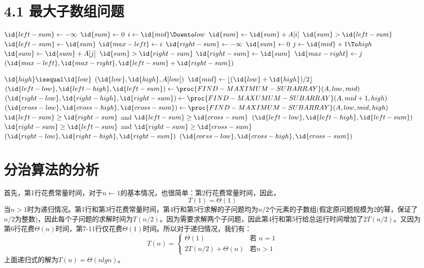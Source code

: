 \documentclass[a4paper,11pt]{article}
\newcommand{\floor}[1]{\left\lfloor #1 \right\rfloor}
\begin{document}
\section*{4.1 最大子数组问题}
\begin{codebox}
\li $\id{left-sum} \gets -\infty$
\li $\id{sum} \gets 0$
\li \For $i \gets \id{mid} \Downto low$
\li 	\Do
			$\id{sum} \gets \id{sum} + A[i]$
\li		\If $\id{sum} > \id{left-sum}$
\li				\Then
					$\id{left-sum} \gets \id{sum}$
\li				$\id{max-left} \gets i$					
					\End
			\End
\li	$\id{right-sum} \gets -\infty$
\li $\id{sum} \gets 0$
\li \For $j \gets \id{mid} + 1 \To high$
\li		\Do
			$\id{sum} \gets \id{sum} + A[j]$
\li		\If $\id{sum} > \id{right-sum}$
\li			\Then
					$\id{right-sum} \gets \id{sum}$
\li				$\id{max-right} \gets j$	
				\End
			\End
			\li \Return $(\id{max-left},\id{max-right},\id{left-sum}+\id{right-sum})$
\end{codebox}

\begin{codebox}
	\li	\If $\id{high} \isequal \id{low}$
	\li		\Then 
					\Return $(\id{low},\id{high},A[low])$
	\li		\Else 
					$\id{mid} \gets \floor{(\id{low}+\id{high})/2}$
	\li			$(\id{left-low},\id{left-high},\id{left-sum}) \gets \proc{FIND-MAXIMUM-SUBARRAY}(A,low,mid)$
	\li			$(\id{right-low},\id{right-high},\id{right-sum}) \gets \proc{FIND-MAXUMUM-SUBARRAY}(A,mid+1,high)$
	\li			$(\id{cross-low},\id{cross-high},\id{cross-sum}) \gets \proc{FIND-MAXIMUM-SUBARRAY}(A,low,mid,high)$
	\li			\If $\id{left-sum} \geq \id{right-sum}$ and $\id{left-sum} \geq \id{cross-sum}$
	\li				\Then \Return $(\id{left-low},\id{left-high},\id{left-sum})$
	\li				\ElseIf $\id{right-sum} \geq \id{left-sum}$ and $\id{right-sum} \geq \id{cross-sum}$
	\li				\Then \Return $(\id{right-low},\id{right-high},\id{right-sum})$
	\li				\ElseNoIf \Return $(\id{corss-low},\id{cross-high},\id{cross-sum})$
						\End
				\End
\end{codebox}
\section*{分治算法的分析}
首先，第1行花费常量时间，对于$n \gets 1$的基本情况，也很简单：第2行花费常量时间，因此，
\[
	T(1) = \Theta(1)
\]
当$n>1$时为递归情况。第1行和第3行花费常量时间，第4行和第5行求解的子问题均为$n/2$个元素的子数组(假定原问题规模为2的幂，保证了$n/2$为整数)，因此每个子问题的求解时间为$T(n/2)$。因为需要求解两个子问题，因此第4行和第5行给总运行时间增加了$2T(n/2)$。又因为第6行花费$\Theta(n)$时间，第7-11行仅花费$\Theta(1)$时间。所以对于递归情况，我们有：
\[
	T(n)=
	\begin{cases}
		\Theta(1) & \text{若 $n=1$}\\
		2T(n/2) + \Theta(n) & \text{若$n>1$}
	\end{cases}
\]
上面递归式的解为$T(n)=\Theta(nlgn)$。
\end{document}
